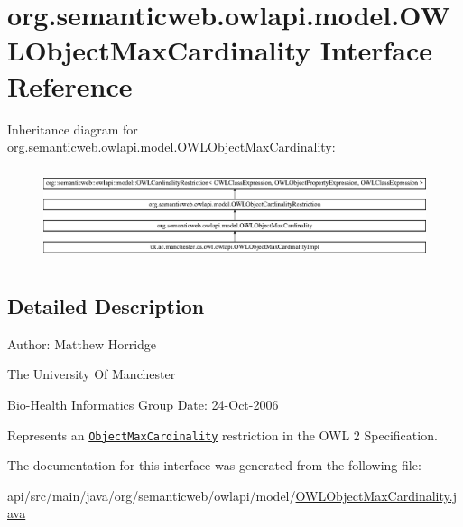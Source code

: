 \hypertarget{interfaceorg_1_1semanticweb_1_1owlapi_1_1model_1_1_o_w_l_object_max_cardinality}{\section{org.\-semanticweb.\-owlapi.\-model.\-O\-W\-L\-Object\-Max\-Cardinality Interface Reference}
\label{interfaceorg_1_1semanticweb_1_1owlapi_1_1model_1_1_o_w_l_object_max_cardinality}
}
Inheritance diagram for org.\-semanticweb.\-owlapi.\-model.\-O\-W\-L\-Object\-Max\-Cardinality\-:\begin{figure}[H]
\begin{center}
\leavevmode
\includegraphics[height=2.758621cm]{interfaceorg_1_1semanticweb_1_1owlapi_1_1model_1_1_o_w_l_object_max_cardinality}
\end{center}
\end{figure}


\subsection{Detailed Description}
Author\-: Matthew Horridge\par
 The University Of Manchester\par
 Bio-\/\-Health Informatics Group Date\-: 24-\/\-Oct-\/2006 

Represents an \href{http://www.w3.org/TR/2009/REC-owl2-syntax-20091027/#Maximum_Cardinality_2}{\tt Object\-Max\-Cardinality} restriction in the O\-W\-L 2 Specification. 

The documentation for this interface was generated from the following file\-:\begin{DoxyCompactItemize}
\item 
api/src/main/java/org/semanticweb/owlapi/model/\hyperlink{_o_w_l_object_max_cardinality_8java}{O\-W\-L\-Object\-Max\-Cardinality.\-java}\end{DoxyCompactItemize}

